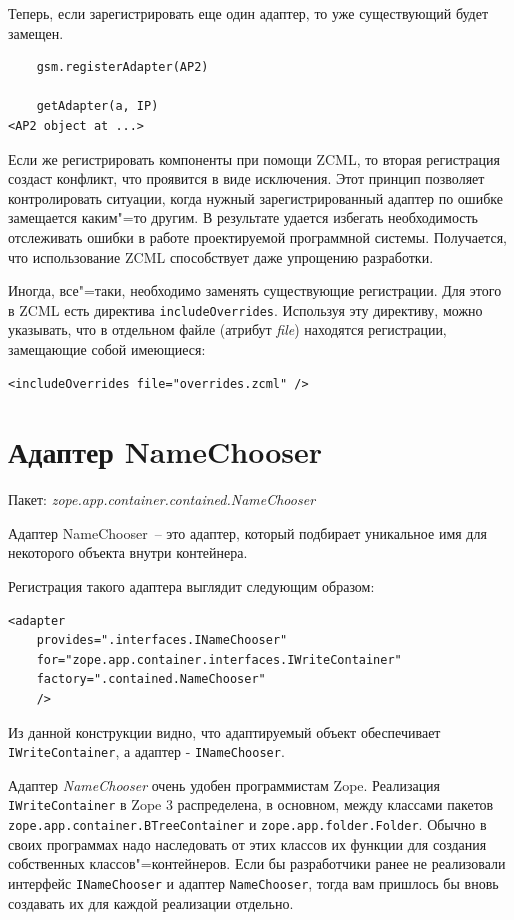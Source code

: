 \documentclass[a4paper,openany,twoside,draft]{book}
\providecommand*{\DUroletitlereference}[1]{\textsl{#1}}
\begin{document}
Теперь, если зарегистрировать еще один адаптер, то уже существующий будет замещен.

\begin{verbatim}
    gsm.registerAdapter(AP2)

    getAdapter(a, IP)
<AP2 object at ...>
\end{verbatim}

Если же регистрировать компоненты при помощи ZCML, то вторая регистрация создаст конфликт, что проявится в виде исключения.  Этот принцип позволяет контролировать ситуации, когда нужный зарегистрированный адаптер по ошибке замещается каким"=то другим.  В результате удается избегать необходимость отслеживать ошибки в работе проектируемой программной системы.  Получается, что использование ZCML способствует даже упрощению разработки.

Иногда, все"=таки, необходимо заменять существующие регистрации.  Для этого в ZCML есть директива \texttt{includeOverrides}.  Используя эту директиву, можно указывать, что в отдельном файле (атрибут \DUroletitlereference{file}) находятся регистрации, замещающие собой имеющиеся:

\begin{verbatim}
<includeOverrides file="overrides.zcml" />
\end{verbatim}


\section{Адаптер NameChooser%
  \label{namechooser}%
}

Пакет: \DUroletitlereference{zope.app.container.contained.NameChooser}

Адаптер NameChooser~-- это адаптер, который подбирает уникальное имя для некоторого объекта внутри контейнера.

Регистрация такого адаптера выглядит следующим образом:

\begin{verbatim}
<adapter
    provides=".interfaces.INameChooser"
    for="zope.app.container.interfaces.IWriteContainer"
    factory=".contained.NameChooser"
    />
\end{verbatim}

Из данной конструкции видно, что адаптируемый объект обеспечивает \texttt{IWriteContainer}, а адаптер - \texttt{INameChooser}.

Адаптер \DUroletitlereference{NameChooser} очень удобен программистам Zope.  Реализация \texttt{IWriteContainer} в Zope 3 распределена, в основном, между классами пакетов \texttt{zope.app.container.BTreeContainer} и \texttt{zope.app.folder.Folder}.  Обычно в своих программах надо наследовать от этих классов их функции для создания собственных классов"=контейнеров.  Если бы разработчики ранее не реализовали интерфейс \texttt{INameChooser} и адаптер \texttt{NameChooser}, тогда вам пришлось бы вновь создавать их для каждой реализации отдельно.
\end{document}
